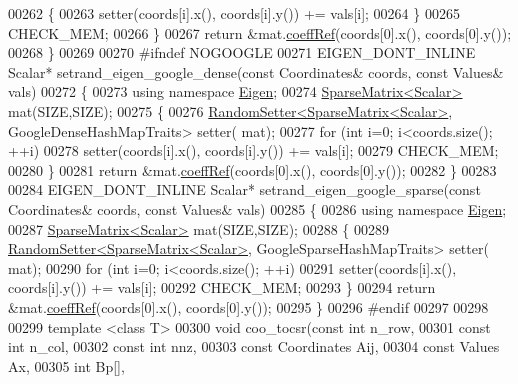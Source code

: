 \begin{DoxyCode}
00262     \{
00263       setter(coords[i].x(), coords[i].y()) += vals[i];
00264     \}
00265     CHECK\_MEM;
00266   \}
00267   \textcolor{keywordflow}{return} &mat.\hyperlink{group___sparse_core___module_a013197b3f598968ff37ed8c97087f1ef}{coeffRef}(coords[0].x(), coords[0].y());
00268 \}
00269 
00270 \textcolor{preprocessor}{#ifndef NOGOOGLE}
00271 EIGEN\_DONT\_INLINE Scalar* setrand\_eigen\_google\_dense(\textcolor{keyword}{const} Coordinates& coords, \textcolor{keyword}{const} Values& vals)
00272 \{
00273   \textcolor{keyword}{using namespace }\hyperlink{namespace_eigen}{Eigen};
00274   \hyperlink{group___sparse_core___module}{SparseMatrix<Scalar>} mat(SIZE,SIZE);
00275   \{
00276     \hyperlink{class_eigen_1_1_random_setter}{RandomSetter<SparseMatrix<Scalar>}, GoogleDenseHashMapTraits> setter(
      mat);
00277     \textcolor{keywordflow}{for} (\textcolor{keywordtype}{int} i=0; i<coords.size(); ++i)
00278       setter(coords[i].x(), coords[i].y()) += vals[i];
00279     CHECK\_MEM;
00280   \}
00281   \textcolor{keywordflow}{return} &mat.\hyperlink{group___sparse_core___module_a013197b3f598968ff37ed8c97087f1ef}{coeffRef}(coords[0].x(), coords[0].y());
00282 \}
00283 
00284 EIGEN\_DONT\_INLINE Scalar* setrand\_eigen\_google\_sparse(\textcolor{keyword}{const} Coordinates& coords, \textcolor{keyword}{const} Values& vals)
00285 \{
00286   \textcolor{keyword}{using namespace }\hyperlink{namespace_eigen}{Eigen};
00287   \hyperlink{group___sparse_core___module}{SparseMatrix<Scalar>} mat(SIZE,SIZE);
00288   \{
00289     \hyperlink{class_eigen_1_1_random_setter}{RandomSetter<SparseMatrix<Scalar>}, GoogleSparseHashMapTraits> setter(
      mat);
00290     \textcolor{keywordflow}{for} (\textcolor{keywordtype}{int} i=0; i<coords.size(); ++i)
00291       setter(coords[i].x(), coords[i].y()) += vals[i];
00292     CHECK\_MEM;
00293   \}
00294   \textcolor{keywordflow}{return} &mat.\hyperlink{group___sparse_core___module_a013197b3f598968ff37ed8c97087f1ef}{coeffRef}(coords[0].x(), coords[0].y());
00295 \}
00296 \textcolor{preprocessor}{#endif}
00297 
00298 
00299 \textcolor{keyword}{template} <\textcolor{keyword}{class} T>
00300 \textcolor{keywordtype}{void} coo\_tocsr(\textcolor{keyword}{const} \textcolor{keywordtype}{int} n\_row,
00301                \textcolor{keyword}{const} \textcolor{keywordtype}{int} n\_col,
00302                \textcolor{keyword}{const} \textcolor{keywordtype}{int} nnz,
00303                \textcolor{keyword}{const} Coordinates Aij,
00304                \textcolor{keyword}{const} Values Ax,
00305                      \textcolor{keywordtype}{int} Bp[],

\end{DoxyCode}
